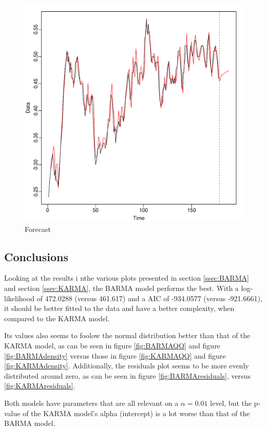 \documentclass[12pt,a4paper,twoside]{article}
\begin{document}
\newpage
\begin{figure}[!ht]
    \centering
    \includegraphics[width=\textwidth]{img/KARMA-forecast.pdf}
    \caption{Forecast}
    \label{fig:KARMAForecast}
\end{figure}
\newpage
\subsection{Conclusions}
Looking at the results i nthe various plots presented in section \ref{ssec:BARMA} and section \ref{ssec:KARMA}, the BARMA model performs the best.
With a log-likelihood of 472.0288 (versus 461.617) and a AIC of -934.0577 (versus -921.6661), it should be better fitted to the data and have a
better complexity, when compared to the KARMA model.

Its values also seems to foolow the normal distribution better than that of the KARMA model, as can be seen in figure \ref{fig:BARMAQQ} and figure
\ref{fig:BARMAdensity} versus those in figure \ref{fig:KARMAQQ} and figure \ref{fig:KARMAdensity}. Additionally, the residuals plot seems to be more
evenly distributed around zero, as can be seen in figure \ref{fig:BARMAresiduals}, versus \ref{fig:KARMAresiduals}.

Both models have parameters that are all relevant on a $\alpha = 0.01$ level, but the p-value of the KARMA model's alpha (intercept) is a lot worse
than that of the BARMA model.
\end{document}
